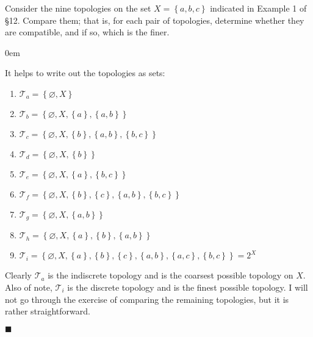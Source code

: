 \documentclass[12pt]{article}
\renewcommand{\qed}{\hfill$\blacksquare$}
\renewenvironment{proof}{\begin{addmargin}[1em]{0em}\begin{newproof}}{\end{newproof}\end{addmargin}\qed}
\newenvironment{problem}[2][Exercise]{\begin{trivlist}
\item[\hskip \labelsep {\bfseries #1}\hskip \labelsep {\bfseries #2.}]}{\end{trivlist}}
\begin{document}
\begin{problem}{13.2}
	Consider the nine topologies on the set $X=\left\{a,b,c\right\}$ indicated in Example 1 of \S12. Compare them; that is, for each pair of topologies, determine whether they are compatible, and if so, which is the finer.
\end{problem}
\begin{proof}
It helps to write out the topologies as sets:
\begin{enumerate}[label=(\alph*)]
	\item $\mathcal{T}_a=\left\{ \varnothing, X \right\}$
	\item $\mathcal{T}_b=\left\{ \varnothing, X, \left\{a\right\}, \left\{a,b\right\} \right\}$
	\item $\mathcal{T}_c=\left\{ \varnothing, X, \left\{b\right\}, \left\{a,b\right\},\left\{b,c\right\} \right\}$
	\item $\mathcal{T}_d=\left\{ \varnothing, X, \left\{b\right\} \right\}$
	\item $\mathcal{T}_e=\left\{ \varnothing, X, \left\{a\right\}, \left\{b,c\right\} \right\}$
	\item $\mathcal{T}_f=\left\{ \varnothing, X, \left\{b\right\}, \left\{c\right\}, \left\{a,b\right\},\left\{b,c\right\} \right\}$
	\item $\mathcal{T}_g=\left\{ \varnothing, X, \left\{a,b\right\} \right\}$
	\item $\mathcal{T}_h=\left\{ \varnothing, X, \left\{a\right\}, \left\{b\right\}, \left\{a,b\right\} \right\}$
	\item $\mathcal{T}_i=\left\{ \varnothing, X, \left\{a\right\}, \left\{b\right\}, \left\{c\right\}, \left\{a,b\right\},\left\{a,c\right\}, \left\{b,c\right\} \right\} = 2^X$
\end{enumerate}
Clearly $\mathcal{T}_a$ is the indiscrete topology and is the coarsest possible topology on $X$.  Also of note, $\mathcal{T}_i$ is the discrete topology and is the finest possible topology. I will not go through the exercise of comparing the remaining topologies, but it is rather straightforward.
\end{proof}
\end{document}
